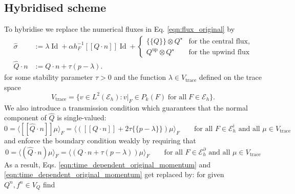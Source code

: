 \documentclass[11pt]{article}
\newcommand{\jump}[1]{[\![ #1]\!]}
\newcommand{\avg}[1]{\{\!\{#1\}\!\}}
\newcommand{\Id}{\operatorname{Id}}
\begin{document}
\subsection{Hybridised scheme}\label{sec:hdg_implicit}
To hybridise we replace the numerical fluxes in Eq. \eqref{eqn:flux_original} by
\begin{equation}
    \begin{aligned}
        \widehat{\sigma}   & := \lambda \Id  + \alpha h_F^{-1} \jump{Q\cdot n} \Id       + \begin{cases}
                                                                                               \avg{Q}\otimes Q^\star       & \text{for the central flux}, \\
                                                                                               Q^{\text{up}}\otimes Q^\star & \text{for the upwind flux}
                                                                                           \end{cases} \\
        \widehat{Q}\cdot n & := Q\cdot n + \tau (p-\lambda).
    \end{aligned}\label{eqn:flux_hdg}
\end{equation}
for some stability parameter $\tau>0$ and the function $\lambda\in V_\text{trace}$ defined on the trace space
\begin{equation}
    V_{\text{trace}} = \{ v\in L^2(\mathcal{E}_h) : v|_F \in P_k(F) \;\text{for all}\;F\in \mathcal{E}_h \}.
\end{equation}
We also introduce a transmission condition which guarantees that the normal component of $\widehat{Q}$ is single-valued:
\begin{equation}
    0 = \langle \jump{\widehat{Q}\cdot n} \mu \rangle_F = \langle (\jump{Q\cdot n} + 2\tau\avg{p-\lambda})\mu \rangle_F \qquad \text{for all $F\in\mathcal{E}_h^i$ and all $\mu\in V_{\text{trace}}$} \label{eqn:jump_condition_interior}
\end{equation}
and enforce the boundary condition weakly by requiring that
\begin{equation}
    0 = \langle (\widehat{Q}\cdot n) \mu \rangle_F = \langle (Q\cdot n + \tau(p-\lambda))\mu \rangle_F \qquad \text{for all $F\in\mathcal{E}_h^\partial$ and all $\mu\in V_{\text{trace}}$}\label{eqn:jump_condition_boundary}
\end{equation}
As a result, Eqs. \eqref{eqn:time_dependent_original_momentum} and \eqref{eqn:time_dependent_original_momentum} get replaced by: for given $Q^n,f^n\in V_Q$ find
\end{document}
